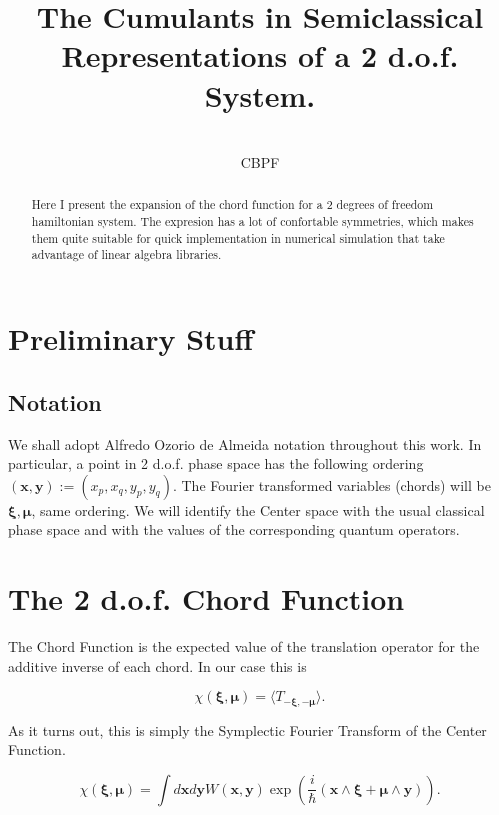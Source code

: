 \documentclass[a4paper,12pt]{article}
\title{The Cumulants in Semiclassical Representations of a 2 d.o.f. System.}
\author{\\CBPF}
\newcommand{\ihb}{\frac{i}{\hbar}}
\newcommand{\xfase}{\mathbf{x}}
\newcommand{\yfase}{\mathbf{y}}
\newcommand{\xifase}{ {\boldsymbol{\xi}} }
\newcommand{\mufase}{ {\boldsymbol{\mu}} }
\begin{document}
\maketitle

\begin{abstract}

Here I present the expansion of the chord function for
a 2 degrees of freedom hamiltonian system. The expresion
has a lot of confortable symmetries, which makes them
quite suitable for quick implementation in numerical simulation
that take advantage of linear algebra libraries. 

\end{abstract}

\section{Preliminary Stuff}

\subsection{Notation}

We shall adopt Alfredo Ozorio de Almeida notation throughout this work. 
In particular, a point in 2 d.o.f. phase space has the 
following ordering  $(\xfase,\yfase):=(x_p,x_q,y_p,y_q)$.
The Fourier transformed variables (chords) will be $\xifase, \mufase$,
same ordering. We will identify the Center space with the usual
classical phase space and with the values of the corresponding
quantum operators. 



\section{The 2 d.o.f. Chord Function}


The Chord Function is the expected value of the 
translation operator for the additive inverse of each chord.
In our case this is 

\begin{equation}
\chi(\xifase,\mufase)=\langle T_{-\xifase,-\mufase}\rangle.
\end{equation}

As it turns out, this is simply the Symplectic Fourier Transform of
the Center Function.

\begin{equation}
\chi(\xifase,\mufase)=\int d\xfase d \yfase W(\xfase,\yfase)
\exp\left(\ihb (\xfase\wedge \xifase +\mufase\wedge\yfase)\right).
\end{equation}
\end{document}
